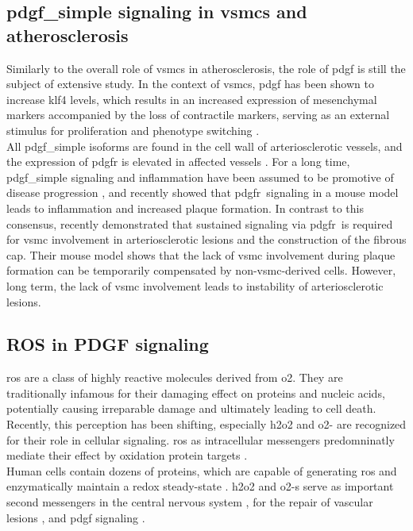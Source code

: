     \subsection{\ac{pdgf_simple} signaling in \acp{vsmc} and atherosclerosis}
    \label{subsec:pdgf_in_disease}
    Similarly to the overall role of \acp{vsmc} in atherosclerosis, the role of \ac{pdgf} is still the subject of extensive study. In the context of \acp{vsmc}, \ac{pdgf} has been shown to increase \ac{klf4} levels, which results in an increased expression of mesenchymal markers accompanied by the loss of contractile markers, serving as an external stimulus for proliferation and phenotype switching \cite{yapSixShadesVascular2021}.\\
    All \ac{pdgf_simple} isoforms are found in the cell wall of arteriosclerotic vessels, and the expression of \ac{pdgfr} is elevated in affected vessels \cite{huTargetingPlateletderivedGrowth2015}. For a long time, \ac{pdgf_simple} signaling and inflammation have been assumed to be promotive of disease progression \cite{andraeRolePlateletderivedGrowth2008, chenPlateletderivedGrowthFactors2013, huTargetingPlateletderivedGrowth2015}, and recently \textcite{hePDGFRbetaSignallingRegulates2015} showed that \ac{pdgfr}\beta~signaling in a mouse model leads to inflammation and increased plaque formation. In contrast to this consensus, \textcite{newmanMultipleCellTypes2021} recently demonstrated that sustained signaling via \ac{pdgfr}\beta~is required for \ac{vsmc} involvement in arteriosclerotic lesions and the construction of the fibrous cap. Their mouse model shows that the lack of \ac{vsmc} involvement during plaque formation can be temporarily compensated by non-\ac{vsmc}-derived cells. However, long term, the lack of \ac{vsmc} involvement leads to instability of arteriosclerotic lesions.

    \subsection{ROS in PDGF signaling}
    \label{subsec:ROS_signaling}
    \Ac{ros} are a class of highly reactive molecules derived from \ac{o2}. They are traditionally infamous for their damaging effect on proteins and nucleic acids, potentially causing irreparable damage and ultimately leading to cell death. Recently, this perception has been shifting, especially \ac{h2o2} and \ac{o2-} are recognized for their role in cellular signaling. \cite{siesReactiveOxygenSpecies2020} \ac{ros} as intracellular messengers predomninatly mediate their effect by oxidation protein targets \cite{zeidaCatalysisPeroxideReduction2019}. \\
    Human cells contain dozens of proteins, which are capable of generating \ac{ros} and enzymatically maintain a redox steady-state \cite{siesReactiveOxygenSpecies2020}. \ac{h2o2} and \acp{o2-} serve as important second messengers in the central nervous system \cite{nayerniaNewInsightsNOX2014}, for the repair of vascular lesions \cite{andraeRolePlateletderivedGrowth2008}, and \ac{pdgf} signaling \cite{sundaresanRequirementGenerationH2O21995, bouziguesRegulationROSResponse2014a}.


